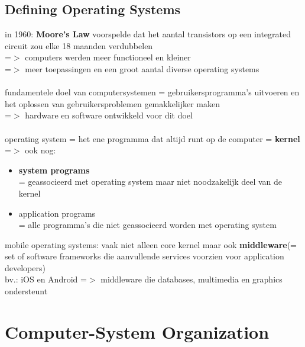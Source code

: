 \documentclass{report}
\begin{document}
\subsection{Defining Operating Systems}
in 1960: \textbf{Moore's Law} voorspelde dat het aantal transistors op een integrated circuit zou elke 18 maanden verdubbelen
\\=$>$ computers werden meer functioneel en kleiner 
\\=$>$ meer toepassingen en een groot aantal diverse operating systems
\\
\\fundamentele doel van computersystemen = gebruikersprogramma's uitvoeren en het oplossen van gebruikersproblemen gemakkelijker maken
\\ =$>$ hardware en software ontwikkeld voor dit doel
\\
\\operating system = het ene programma dat altijd runt op de computer = \textbf{kernel}
\\=$>$ ook nog: 
\begin{itemize}
\item \textbf{system programs}
\\= geassocieerd met operating system maar niet noodzakelijk deel van de kernel
\item application programs
\\= alle programma's die niet geassocieerd worden met operating system
\end{itemize}
mobile operating systems: vaak niet alleen core kernel maar ook \textbf{middleware}(= set of software frameworks die aanvullende services voorzien voor application developers)
\\bv.: iOS en Android =$>$ middleware die databases, multimedia en graphics ondersteunt

\section{Computer-System Organization}
\end{document}
